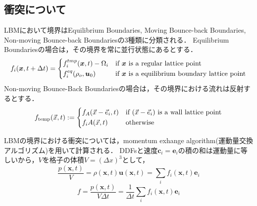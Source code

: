 \subsection{衝突について}\label{sec:lbm-collision}
LBMにおいて境界はEquilibrium Boundaries, Moving Bounce-back Boundaries, Non-moving Bounce-back Boundariesの3種類に分類される．
Equilibrium Boundariesの場合は，その境界を常に並行状態にあるとする．
\begin{equation}
    f_i(\bm{x}, t+\Delta t) =
    \begin{dcases}
        f^{tmp}_{i}(\bm{x}, t) - \Omega_i & \text{if $\bm{x}$ is a regular lattice point}              \\
        f^{eq}_{i}(\rho_o, \bm{u}_0)       & \text{if $\bm{x}$ is a equilibrium boundary lattice point}
    \end{dcases}
\end{equation}
Non-moving Bounce-Back Boundariesの場合は，その境界における流れは反射するとする．
\begin{equation}
    f_{\text{temp}}(\vec{x}, t) :=
    \begin{dcases}
        f_A(\vec{x} - \vec{e}_i, t) & \text{if } (\vec{x} - \vec{e}_i) \text{ is a wall lattice point} \\
        f_iA(\vec{x}, t)            & \text{otherwise}
    \end{dcases}
\end{equation}

LBMの境界における衝突については，momentum exhange algorithm(運動量交換アルゴリズム)を用いて計算される．
DDFsと速度$\bm{c}_i=\bm{e}_i$の積の和は運動量に等しいから，$V$を格子の体積$V=(\Delta x)^3$として，
\begin{equation}\label{eq:momentum-exchange}
    \frac{p(\bm{x}, t)}{V} = \rho(\bm{x}, t) \bm{u}(\bm{x}, t) = \sum_i f_i(\bm{x}, t) \bm{e}_i
\end{equation}
\begin{equation}\label{eq:force}
    f = \frac{p(\bm{x}, t)}{V \Delta t} = \frac{1}{\Delta t} \sum_i f_i(\bm{x}, t) \bm{e}_i
\end{equation}